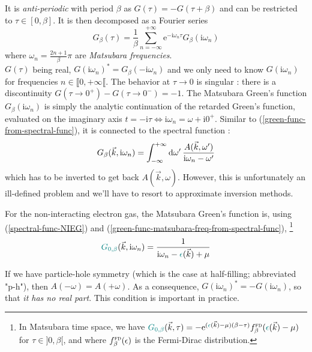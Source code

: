 \documentclass[reprint,amsmath,amssymb,aps,pra]{revtex4-2}
\newcommand{\mathe}{\mathrm{e}}
\newcommand{\mathi}{\mathrm{i}}
\newcommand{\tmem}[1]{{\em #1\/}}
\newcommand{\tmname}[1]{\textsc{#1}}
\newcommand{\iwn}{\mathrm{i}\omega_n}
\begin{document}
It is \tmem{anti-periodic} with period $\beta$ as $G (\tau) = - G (\tau + \beta)$ and can be restricted to $\tau \in [0,\beta]$. It is then decomposed as a Fourier series
\begin{equation}
    G_{\beta} (\tau) = \frac{1}{\beta}  \sum_{n = - \infty}^{+ \infty} \mathe^{-
    \iwn \tau} G_{\beta} (\iwn)
  \label{green-func-matsubara-IFT}
\end{equation}
where $\omega_n = \frac{2 n + 1}{\beta} \pi$ are {\tmem{Matsubara frequencies}}.\\
$G (\tau)$ being real, $G (\iwn)^{\ast} =
G_{\beta} (- \iwn)$ and we only need to know $G(\iwn)$ for frequencies $n \in \llbracket 0, + \infty \llbracket$. The behavior at $\tau \rightarrow 0$ is singular : there is a discontinuity $G (\tau \rightarrow 0^+) - G (\tau \rightarrow 0^-) = - 1$. The Matsubara Green's function $G_{\beta} (\iwn)$ is simply the analytic continuation of the retarded Green's function, evaluated on the imaginary axis $t = -\mathi \tau \Leftrightarrow \iwn = \omega + \mathi 0^+$. Similar to (\ref{green-func-from-spectral-func}), it is connected to the spectral function :
\begin{equation}
    G_{\beta} (\vec{k}, \iwn) = \int_{- \infty}^{+ \infty} \dd{\omega'} \frac{A (\vec{k}, \omega')}{\iwn - \omega'}\\
\label{green-func-matsubara-freq-from-spectral-func}
\end{equation}
which has to be inverted to get back $A (\vec{k}, \omega)$. However, this is unfortunately an ill-defined problem and we'll have to resort to approximate inversion methods.

For the non-interacting electron gas, the Matsubara Green's
function is, using (\ref{spectral-func-NIEG}) and (\ref{green-func-matsubara-freq-from-spectral-func}), \footnote{
In Matsubara time space, we have ${\color[HTML]{008080}G_{0, \beta}} (\vec{k}, \tau) = -
   \mathe^{({\color[HTML]{008080}\epsilon} (\vec{k}) - \mu)  (\beta - \tau)}
   f^{\mathrm{{\tmname{fd}}}}_{\beta} ({\color[HTML]{008080}\epsilon}
   (\vec{k}) - \mu)$ for $\tau \in] 0, \beta [$, and where  $f^{\mathrm{{\tmname{fd}}}}_{\beta} (\epsilon)$ is the Fermi-Dirac distribution.
}
\begin{equation}
  {\color[HTML]{008080}G_{0, \beta}} (\vec{k}, \iwn) =
  \frac{1}{\iwn - {\color[HTML]{008080}\epsilon} (\vec{k}) + \mu}
  \label{green-func-matsubara-non-interacting}
\end{equation}

If we have particle-hole symmetry (which is the case at half-filling; abbreviated "p-h"), then $A (-\omega) = A (+\omega)$. As a consequence, $G (\iwn)^{\ast} = {- G (\iwn)}$, so that \emph{it has no real part}. This condition is important in practice.
\end{document}
